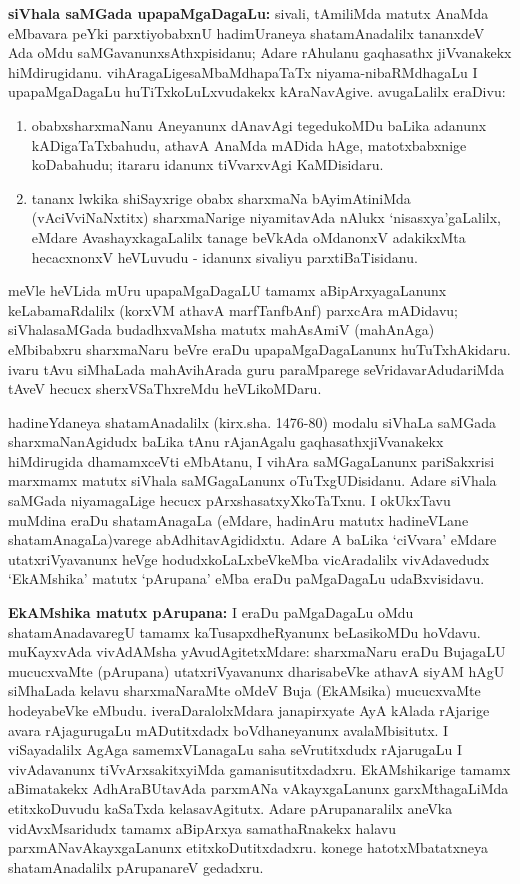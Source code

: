 \smallskip

{\bf siVhala saMGada upapaMgaDagaLu:} sivali, tAmiliMda matutx AnaMda eMbavara peYki parxtiyobabxnU hadimUraneya shatamAnadalilx tananxdeV Ada oMdu saMGavanunx\break sAthxpisidanu; Adare rAhulanu gaqhasathx jiVvanakekx hiMdirugidanu. vihAragaLige\break saMbaMdhapaTaTx niyama-nibaRMdhagaLu I upapaMgaDagaLu huTiTxkoLuLxvudakekx kAraNa\-vAgive. avugaLalilx eraDivu:
\begin{enumerate}
\renewcommand{\theenumi}{\alph{enumi}}
\renewcommand{\labelenumi}{(\theenumi)}
\item obabxsharxmaNanu Aneyanunx dAnavAgi tegedukoMDu baLika adanunx kADigaTaTx\-bahudu, athavA AnaMda mADida hAge, matotxbabxnige koDabahudu; itararu idanunx tiVvarxvAgi KaMDisidaru.

\newpage

\item tananx lwkika shiSayxrige obabx sharxmaNa bAyimAtiniMda (vAciVviNaNxtitx) sharxmaNarige niyamitavAda nAlukx `nisasxya'gaLalilx, eMdare AvashayxkagaLalilx tanage beVkAda oMdanonxV adakikxMta hecacxnonxV heVLuvudu - idanunx sivaliyu parxtiBaTisidanu.
\end{enumerate}

meVle heVLida mUru upapaMgaDagaLU tamamx aBipArxyagaLanunx keLabamaRdalilx (korxVM athavA marfTanfbAnf) parxcAra mADidavu; siVhalasaMGada budadhxvaMsha matutx mahAsAmiV (mahAnAga) eMbibabxru sharxmaNaru beVre eraDu upapaMgaDagaLanunx huTuTxhAkidaru. ivaru tAvu siMhaLada mahAvihArada guru paraMparege seVri\-dava\-rAdudariMda tAveV hecucx sherxVSaThxreMdu heVLikoMDaru.

hadineYdaneya shatamAnadalilx (kirx.sha. 1476-80) modalu siVhaLa saMGada sharxmaNanAgidudx baLika tAnu rAjanAgalu gaqhasathxjiVvanakekx hiMdirugida dhamamxceVti eMbAtanu, I vihAra saMGagaLanunx pariSakxrisi marxmamx matutx siVhala saMGagaLanunx oTuTxgUDisidanu. Adare siVhala saMGada niyamagaLige hecucx pArxshasatxyXkoTaTxnu. I okUkxTavu muMdina eraDu shatamAnagaLa (eMdare, hadinAru matutx hadineVLane shatamAnagaLa)varege abAdhitavAgididxtu. Adare A baLika `ciVvara' eMdare utatxriVyavanunx heVge hodudxkoLaLxbeVkeMba vicAradalilx vivAdavedudx `EkAMshika' matutx `pArupana' eMba eraDu paMgaDagaLu udaBxvisidavu.

{\bf EkAMshika matutx pArupana:} I eraDu paMgaDagaLu oMdu shatamAnadavaregU tamamx kaTusapxdheRyanunx beLasikoMDu hoVdavu. muKayxvAda vivAdAMsha yAvudAgitetxMdare: sharxmaNaru eraDu BujagaLU mucucxvaMte (pArupana) utatxriVyavanunx dharisabeVke athavA siyAM hAgU siMhaLada kelavu sharxmaNaraMte oMdeV Buja (EkAMsika) mucucxvaMte hodeyabeVke eMbudu. iveraDaralolxMdara janapirxyate AyA kAlada rAjarige avara rAjagurugaLu mADutitxdadx boVdhaneyanunx avalaMbisitutx. I viSayadalilx AgAga samemxVLanagaLu saha seVrutitxdudx rAjarugaLu I vivAdavanunx tiVvArxsakitxyiMda gamanisutitxdadxru. EkAMshikarige tamamx aBimatakekx AdhAraBUtavAda parxmANa vAkayxgaLanunx garxMthagaLiMda etitxkoDuvudu kaSaTxda kelasavAgitutx. Adare pArupanaralilx aneVka vidAvxMsaridudx tamamx aBipArxya samathaRnakekx halavu parxmANavAkayxgaLanunx etitxkoDutitxdadxru. konege hatotxMbatatxneya shatamAnadalilx pArupanareV gedadxru.

